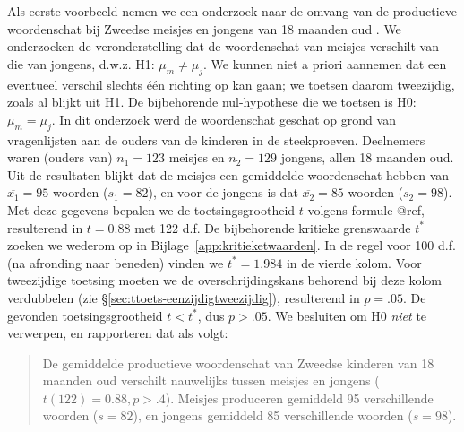 \documentclass[
]{book}
\begin{document}
Als eerste voorbeeld nemen we een onderzoek naar de omvang van de
productieve woordenschat bij Zweedse meisjes en jongens van 18 maanden
oud \citep{Ande11}. We onderzoeken de veronderstelling dat de woordenschat
van meisjes verschilt van die van jongens, d.w.z. H1: \(\mu_m \ne \mu_j\).
We kunnen niet a priori aannemen dat een eventueel verschil slechts één
richting op kan gaan; we toetsen daarom tweezijdig, zoals al blijkt uit
H1. De bijbehorende nul-hypothese die we toetsen is H0: \(\mu_m = \mu_j\).
In dit onderzoek werd de woordenschat geschat op grond van vragenlijsten
aan de ouders van de kinderen in de steekproeven. Deelnemers waren
(ouders van) \(n_1=123\) meisjes en \(n_2=129\) jongens, allen 18 maanden
oud. Uit de resultaten blijkt dat de meisjes een gemiddelde woordenschat
hebben van \(\overline{x_1}=95\) woorden (\(s_1=82\)), en voor de jongens is
dat \(\overline{x_2}=85\) woorden (\(s_2=98\)). Met deze gegevens bepalen we
de toetsingsgrootheid \(t\) volgens formule
@ref\label{eq:t-homoskedastic}, resulterend in \(t=0.88\) met 122 d.f. De
bijbehorende kritieke grenswaarde \(t^*\) zoeken we wederom op in
Bijlage~\ref{app:kritieketwaarden}. In de regel voor 100 d.f. (na
afronding naar beneden) vinden we \(t^*=1.984\) in de vierde kolom. Voor
tweezijdige toetsing moeten we de overschrijdingskans behorend bij deze
kolom verdubbelen (zie
§\ref{sec:ttoets-eenzijdigtweezijdig}), resulterend in \(p=.05\). De
gevonden toetsingsgrootheid \(t < t^*\), dus \(p>.05\). We besluiten om H0
\emph{niet} te verwerpen, en rapporteren dat als volgt:

\begin{quote}
De gemiddelde productieve woordenschat van Zweedse kinderen van 18
maanden oud verschilt nauwelijks tussen meisjes en jongens
(\(t(122)=0.88, p>.4\)). Meisjes produceren gemiddeld 95 verschillende
woorden (\(s=82\)), en jongens gemiddeld 85 verschillende woorden
(\(s=98\)).
\end{quote}
\end{document}
